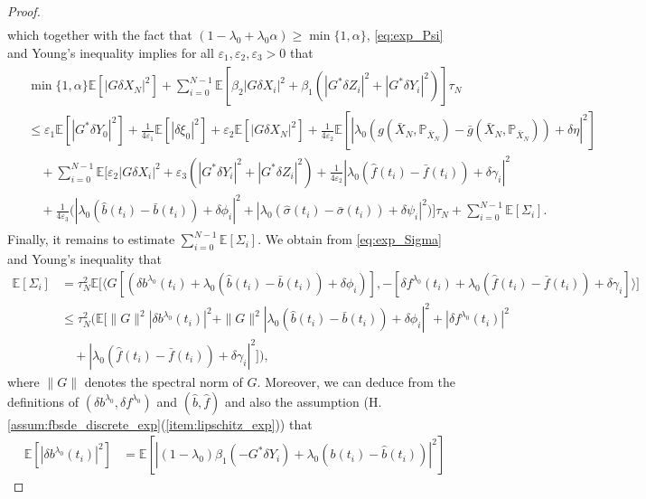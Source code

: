 \documentclass[11pt]{article}
\numberwithin{equation}{section}
\theoremstyle{definition}
\theoremstyle{remark}
\def\b{\beta}  \def\a{\alpha} \def\ga{\gamma}
\def\eps{\varepsilon}
\def \la{\langle} \def\ra{\rangle}
\def\sE{{\mathbb{E}}}
\def\sP{\mathbb{P}}
\begin{document}
\begin{proof}
\begin{align*}
\end{align*}
which together with
the fact that  
$(1-\lambda_0+\lambda_0\a)\ge \min\{1,\a\}$,
\eqref{eq:exp_Psi} and
 Young's inequality implies for all $\eps_1,\eps_2,\eps_3>0$ that 
\begin{align*}
\begin{split}
&\min\{1,\a\} \sE[
|G\delta X_{N}|^2]
+
 \sum_{i=0}^{N-1}
  \sE[
\beta_2|G\delta X_{i}|^2
+
\beta_1(
|G^*\delta Z_i|^2+|G^*\delta Y_{i}|^2
) ]\tau_N
\\
& \le
\eps_1\sE[ |G^*\delta Y_0|^2]
+\frac{1}{4\eps_1}\sE[ | \delta \xi_0|^2]
+
\eps_2
\sE[ |G\delta X_N|^2]
+
\frac{1}{4\eps_2}\sE[ |\lambda_0(g(\bar{X}_N,\sP_{\bar{X}_N})-\bar{g}(\bar{X}_N,\sP_{\bar{X}_N}))
+\delta \eta|^2]
\\
&\quad
 +\sum_{i=0}^{N-1}
 \sE\bigg[
\eps_2 | G \delta X_i|^2+\eps_3 (|G^*\delta Y_{i}|^2+| G^*\delta  {Z}_i|^2)
+\frac{1}{4\eps_2}
|
\lambda _0
(\hat{f}(t_{i})-\bar{f}(t_{i}))+\delta \gamma_i|^2
\\
& \quad
+
\frac{1}{4\eps_3}
\bigg(
 |
 \lambda_0(
 \hat{b}(t_{i})-\bar{b}(t_{i}))+\delta \phi_{i}|^2
 +
 | 
 \lambda_0( \hat{\sigma}(t_i)-\bar{\sigma}(t_i))+\delta \psi_{i}|^2
 \bigg) \bigg]\tau_N
 +\sum_{i=0}^{N-1} \sE[\Sigma_i].
\end{split}
\end{align*}
Finally, it remains to estimate $\sum_{i=0}^{N-1} \sE[\Sigma_i]$.
We obtain from
\eqref{eq:exp_Sigma} and
Young's inequality
 that
\begin{align*}
\sE[\Sigma_i]
&=
\tau_N^2
\sE\big[
\la  G [(\delta b^{\lambda_0}(t_{i})+{\lambda_0}(\hat{b}(t_{i})-\bar{b}(t_{i}))+\delta \phi_{i})],
-[\delta f^{\lambda_0}(t_{i})+{\lambda_0}(\hat{f}(t_{i})-\bar{f}(t_{i}))+\delta \gamma_i]
\ra
\big]
\\
&\le
\tau_N^2
\bigg(
\sE\big[
\|G\|^2|\delta b^{\lambda_0}(t_{i})|^2
 +\|G\|^2|{\lambda_0}(\hat{b}(t_{i})-\bar{b}(t_{i}))+\delta \phi_{i}|^2
 +|\delta f^{\lambda_0}(t_{i})|^2
 \\
&\quad
 +|{\lambda_0}(\hat{f}(t_{i})-\bar{f}(t_{i}))+\delta \gamma_i|^2
\big]
\bigg),
\end{align*}
where $\|G\|$ denotes the spectral norm of $G$.
Moreover, we can deduce from the definitions of $(\delta{b}^{\lambda_0},\delta{f}^{\lambda_0})$ and 
$(\hat{b},\hat{f})$ and also
the assumption (H.\ref{assum:fbsde_discrete_exp}(\ref{item:lipschitz_exp})) that
\begin{align*}
\sE[|\delta b^{\lambda_0}(t_{i})|^2]
&=\sE[|(1-\lambda_0)\b_1(-G^*\delta Y_i)+\lambda_0 (b(t_i)-\hat{b}(t_i))|^2]

\end{align*}
\end{proof}
\end{document}
